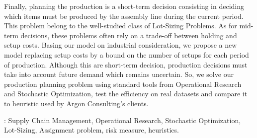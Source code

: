 Finally, planning the production is a short-term decision consisting in deciding which items must be produced by the assembly line during the current period.
This problem belong to the well-studied class of Lot-Sizing Problems.
As for mid-term decisions, these problems often rely on a trade-off between holding and setup costs.
Basing our model on industrial consideration, we propose a new model replacing setup costs by a bound on the number of setups for each period of production.
Although this are short-term decision, production decisions must take into account future demand which remains uncertain.
So, we solve our production planning problem using standard tools from Operational Research and Stochastic Optimization, test the efficiency on real datasets and compare it to heuristic used by Argon Consulting's clients.


: Supply Chain Management, Operational Research, Stochastic Optimization, Lot-Sizing, Assignment problem, risk measure, heuristics.

